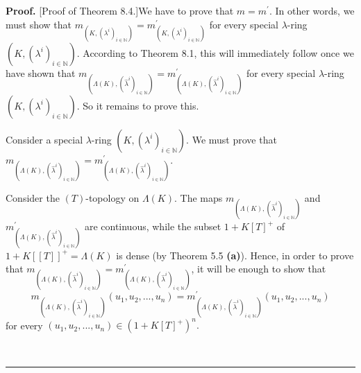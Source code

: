 \documentclass[numbers=enddot,12pt,final,onecolumn,notitlepage]{scrartcl}%
\newenvironment{proof}[1][Proof]{\noindent\textbf{#1.} }{\ \rule{0.5em}{0.5em}}
\begin{document}
\begin{proof}
[Proof of Theorem 8.4.]We have to prove that $m=m^{\prime}$. In other words,
we must show that $m_{\left(  K,\left(  \lambda^{i}\right)  _{i\in\mathbb{N}%
}\right)  }=m_{\left(  K,\left(  \lambda^{i}\right)  _{i\in\mathbb{N}}\right)
}^{\prime}$ for every special $\lambda$-ring $\left(  K,\left(  \lambda
^{i}\right)  _{i\in\mathbb{N}}\right)  $. According to Theorem 8.1, this will
immediately follow once we have shown that $m_{\left(  \Lambda\left(
K\right)  ,\left(  \widehat{\lambda}^{i}\right)  _{i\in\mathbb{N}}\right)
}=m_{\left(  \Lambda\left(  K\right)  ,\left(  \widehat{\lambda}^{i}\right)
_{i\in\mathbb{N}}\right)  }^{\prime}$ for every special $\lambda$-ring
$\left(  K,\left(  \lambda^{i}\right)  _{i\in\mathbb{N}}\right)  $. So it
remains to prove this.

Consider a special $\lambda$-ring $\left(  K,\left(  \lambda^{i}\right)
_{i\in\mathbb{N}}\right)  $. We must prove that $m_{\left(  \Lambda\left(
K\right)  ,\left(  \widehat{\lambda}^{i}\right)  _{i\in\mathbb{N}}\right)
}=m_{\left(  \Lambda\left(  K\right)  ,\left(  \widehat{\lambda}^{i}\right)
_{i\in\mathbb{N}}\right)  }^{\prime}$.

Consider the $\left(  T\right)  $-topology on $\Lambda\left(  K\right)  $. The
maps $m_{\left(  \Lambda\left(  K\right)  ,\left(  \widehat{\lambda}%
^{i}\right)  _{i\in\mathbb{N}}\right)  }$ and $m_{\left(  \Lambda\left(
K\right)  ,\left(  \widehat{\lambda}^{i}\right)  _{i\in\mathbb{N}}\right)
}^{\prime}$ are continuous, while the subset $1+K\left[  T\right]  ^{+}$ of
$1+K\left[  \left[  T\right]  \right]  ^{+}=\Lambda\left(  K\right)  $ is
dense (by Theorem 5.5 \textbf{(a)}). Hence, in order to prove that $m_{\left(
\Lambda\left(  K\right)  ,\left(  \widehat{\lambda}^{i}\right)  _{i\in
\mathbb{N}}\right)  }=m_{\left(  \Lambda\left(  K\right)  ,\left(
\widehat{\lambda}^{i}\right)  _{i\in\mathbb{N}}\right)  }^{\prime}$, it will
be enough to show that
\begin{equation}
m_{\left(  \Lambda\left(  K\right)  ,\left(  \widehat{\lambda}^{i}\right)
_{i\in\mathbb{N}}\right)  }\left(  u_{1},u_{2},...,u_{n}\right)  =m_{\left(
\Lambda\left(  K\right)  ,\left(  \widehat{\lambda}^{i}\right)  _{i\in
\mathbb{N}}\right)  }^{\prime}\left(  u_{1},u_{2},...,u_{n}\right)
\label{8.4.goal}%
\end{equation}
for every $\left(  u_{1},u_{2},...,u_{n}\right)  \in\left(  1+K\left[
T\right]  ^{+}\right)  ^{n}.$


\end{proof}
\end{document}
